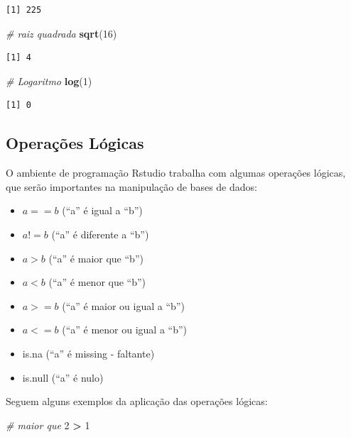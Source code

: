 \documentclass[12pt,brazil,oneside]{book}
\newenvironment{Shaded}{\begin{snugshade}}{\end{snugshade}}
\newcommand{\CommentTok}[1]{\textcolor[rgb]{0.56,0.35,0.01}{\textit{#1}}}
\newcommand{\DecValTok}[1]{\textcolor[rgb]{0.00,0.00,0.81}{#1}}
\newcommand{\KeywordTok}[1]{\textcolor[rgb]{0.13,0.29,0.53}{\textbf{#1}}}
\newcommand{\NormalTok}[1]{#1}
\newcommand{\OperatorTok}[1]{\textcolor[rgb]{0.81,0.36,0.00}{\textbf{#1}}}
\newcommand{\StringTok}[1]{\textcolor[rgb]{0.31,0.60,0.02}{#1}}
\providecommand{\tightlist}{%
  \setlength{\itemsep}{0pt}\setlength{\parskip}{0pt}}
\begin{document}
\begin{verbatim}
[1] 225
\end{verbatim}

\begin{Shaded}
\begin{Highlighting}[]
\CommentTok{# raiz quadrada}
\KeywordTok{sqrt}\NormalTok{(}\DecValTok{16}\NormalTok{)}
\end{Highlighting}
\end{Shaded}

\begin{verbatim}
[1] 4
\end{verbatim}

\begin{Shaded}
\begin{Highlighting}[]
\CommentTok{# Logaritmo }
\KeywordTok{log}\NormalTok{(}\DecValTok{1}\NormalTok{)}
\end{Highlighting}
\end{Shaded}

\begin{verbatim}
[1] 0
\end{verbatim}

\hypertarget{operacoes-logicas}{%
\subsection{Operações Lógicas}\label{operacoes-logicas}}

O ambiente de programação Rstudio trabalha com algumas operações lógicas, que serão importantes na manipulação de bases de dados:

\begin{itemize}
\tightlist
\item
  \(a == b\) (``a'' é igual a ``b'')
\item
  \(a != b\) (``a'' é diferente a ``b'')
\item
  \(a > b\) (``a'' é maior que ``b'')
\item
  \(a < b\) (``a'' é menor que ``b'')
\item
  \(a >= b\) (``a'' é maior ou igual a ``b'')
\item
  \(a <= b\) (``a'' é menor ou igual a ``b'')
\item
  is.na (``a'' é missing - faltante)
\item
  is.null (``a'' é nulo)
\end{itemize}

Seguem alguns exemplos da aplicação das operações lógicas:

\begin{Shaded}
\begin{Highlighting}[]
\CommentTok{# maior que }
\DecValTok{2} \OperatorTok{>}\StringTok{ }\DecValTok{1}
\end{Highlighting}
\end{Shaded}
\end{document}
